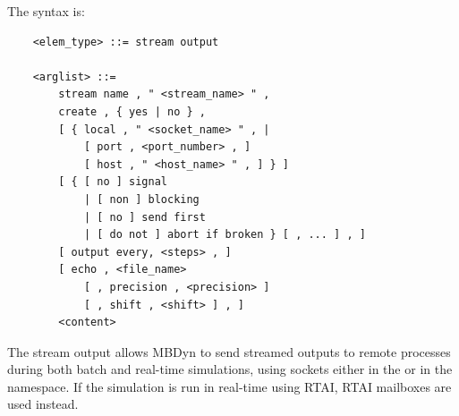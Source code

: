 The syntax is:
\begin{verbatim}
    <elem_type> ::= stream output

    <arglist> ::=
        stream name , " <stream_name> " ,
        create , { yes | no } ,
        [ { local , " <socket_name> " , |
            [ port , <port_number> , ]
            [ host , " <host_name> " , ] } ]
        [ { [ no ] signal
            | [ non ] blocking
            | [ no ] send first
            | [ do not ] abort if broken } [ , ... ] , ]
        [ output every, <steps> , ]
        [ echo , <file_name>
            [ , precision , <precision> ]
            [ , shift , <shift> ] , ]
        <content>
\end{verbatim}
The stream output allows MBDyn to send streamed outputs 
to remote processes during both batch and real-time simulations,
using sockets either in the  or in the  namespace.
If the simulation is run in real-time using RTAI, RTAI mailboxes
are used instead.

